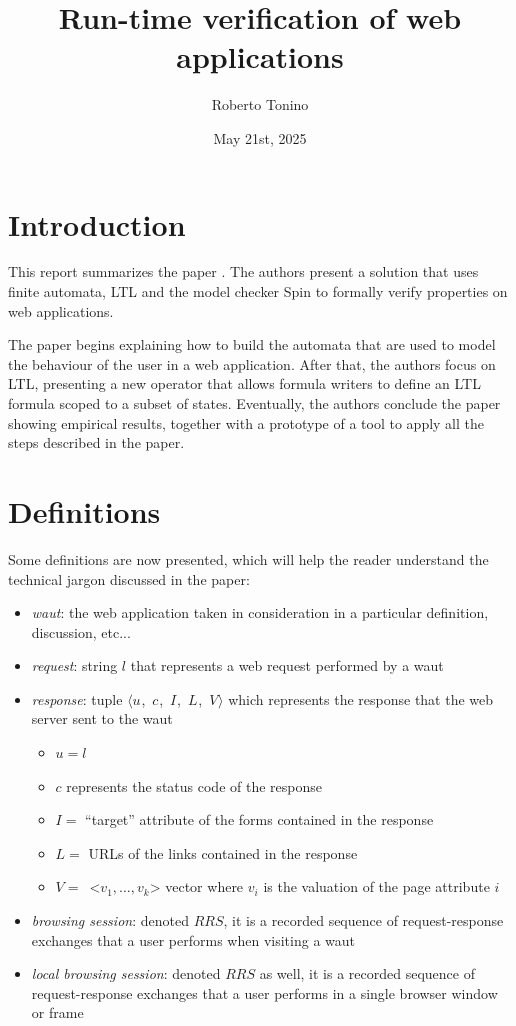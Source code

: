 \documentclass[a4paper,10pt]{article}
\title{Run-time verification of web applications}
\author{Roberto Tonino}
\date{May 21st, 2025}
\newcommand{\res}[1][]{
  \ifthenelse{\equal{#1}{}}{\mbox{$\langle u$, $c$, $I$, $L$, $V\rangle$}}
  {\mbox{$\langle u_{#1}$, $c_{#1}$, $I_{#1}$, $L_{#1}$, $V_{#1}\rangle$}}
}
\theoremstyle{plain} %
\theoremstyle{definition}
\theoremstyle{remark}
\begin{document}
\maketitle

\tableofcontents

\clearpage

\section{Introduction}

This report summarizes the paper . The authors present a solution that uses finite automata, LTL and the model checker Spin to formally verify properties on web applications.

The paper begins explaining how to build the automata that are used to model the behaviour of the user in a web application. After that, the authors focus on LTL, presenting a new operator that allows formula writers to define an LTL formula scoped to a subset of states. Eventually, the authors conclude the paper showing empirical results, together with a prototype of a tool to apply all the steps described in the paper.

\section{Definitions}

Some definitions are now presented, which will help the reader understand the technical jargon discussed in the paper:

\begin{itemize}
  \item \textit{\gls{waut}}: the web application taken in consideration in a particular definition, discussion, etc...
  \item \textit{request}: string $l$ that represents a web request performed by a \gls{waut}
  \item \textit{response}: tuple \res which represents the response that the web server sent to the \gls{waut}
    \begin{itemize}
      \item $u = l$
      \item $c$ represents the status code of the response \cite{Fielding2022}
      \item $I =$ ``target'' attribute of the forms contained in the response
      \item $L =$ URLs of the links contained in the response
      \item $V =$\ <$v_1,\dots,v_k$> vector where $v_i$ is the valuation of the page attribute $i$
    \end{itemize}
  \item \textit{browsing session}: denoted $RRS$, it is a recorded sequence of request-response exchanges that a user performs when visiting a \gls{waut}
  \item \textit{local browsing session}: denoted $RRS$ as well, it is a recorded sequence of request-response exchanges that a user performs in a single browser window or frame
\end{itemize}
\end{document}

